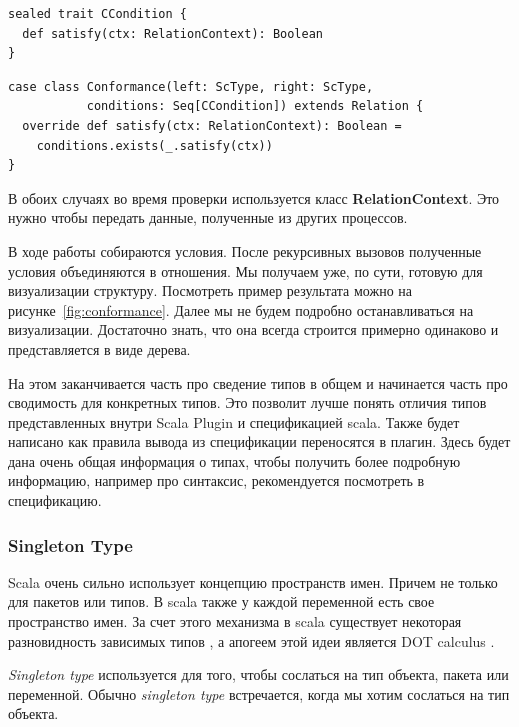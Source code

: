 \begin{lstlisting}[caption={Узел условия},label={lst:condition}]
sealed trait CCondition {
  def satisfy(ctx: RelationContext): Boolean
}
\end{lstlisting}

\begin{lstlisting}[caption={Узел отношения},label={lst:conformance}]
case class Conformance(left: ScType, right: ScType,
           conditions: Seq[CCondition]) extends Relation {
  override def satisfy(ctx: RelationContext): Boolean =
    conditions.exists(_.satisfy(ctx))
}
\end{lstlisting}

В обоих случаях во время проверки используется класс \textbf{RelationContext}.
Это нужно чтобы передать данные, полученные из других процессов.

В ходе работы собираются условия.
После рекурсивных вызовов полученные условия объединяются в отношения.
Мы получаем уже, по сути, готовую для визуализации структуру.
Посмотреть пример результата можно на рисунке~\ref{fig:conformance}.
Далее мы не будем подробно останавливаться на визуализации.
Достаточно знать, что она всегда строится примерно одинаково и представляется в
виде дерева.


На этом заканчивается часть про сведение типов в общем и начинается часть про
сводимость для конкретных типов.
Это позволит лучше понять отличия типов представленных внутри Scala Plugin
и спецификацией scala.
Также будет написано как правила вывода из спецификации переносятся в плагин.
Здесь будет дана очень общая информация о типах, чтобы получить более подробную
информацию, например про синтаксис, рекомендуется посмотреть в спецификацию.

%

\subsubsection{Singleton Type}
Scala очень сильно использует концепцию пространств имен.
Причем не только для пакетов или типов.
В scala также у каждой переменной есть свое пространство имен.
За счет этого механизма в scala существует некоторая разновидность зависимых
типов \cite{dependent_types}, а апогеем этой идеи является DOT calculus
\cite{dot_calculus}.

\textit{Singleton type} используется для того, чтобы сослаться на тип объекта,
пакета или переменной.
Обычно \textit{singleton type} встречается, когда мы хотим сослаться на тип объекта.

